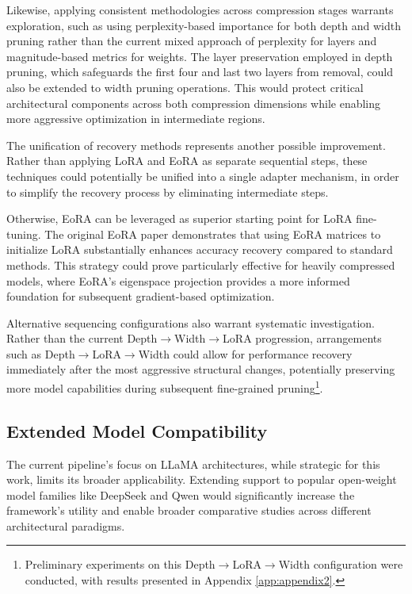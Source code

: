 Likewise, applying consistent methodologies across compression stages warrants exploration, such as using perplexity-based importance for both depth and width pruning rather than the current mixed approach of perplexity for layers and magnitude-based metrics for weights. The layer preservation employed in depth pruning, which safeguards the first four and last two layers from removal, could also be extended to width pruning operations. This would protect critical architectural components across both compression dimensions while enabling more aggressive optimization in intermediate regions.

The unification of recovery methods represents another possible improvement. Rather than applying LoRA and EoRA as separate sequential steps, these techniques could potentially be unified into a single adapter mechanism, in order to simplify the recovery process by eliminating intermediate steps.

Otherwise, EoRA can be leveraged as superior starting point for LoRA fine-tuning. The original EoRA paper \cite{eora} demonstrates that using EoRA matrices to initialize LoRA substantially enhances accuracy recovery compared to standard methods. This strategy could prove particularly effective for heavily compressed models, where EoRA's eigenspace projection provides a more informed foundation for subsequent gradient-based optimization.

Alternative sequencing configurations also warrant systematic investigation. Rather than the current Depth$\rightarrow$Width$\rightarrow$LoRA progression, arrangements such as Depth$\rightarrow$LoRA$\rightarrow$Width could allow for performance recovery immediately after the most aggressive structural changes, potentially preserving more model capabilities during subsequent fine-grained pruning\footnote{Preliminary experiments on this Depth$\rightarrow$LoRA$\rightarrow$Width configuration were conducted, with results presented in Appendix \ref{app:appendix2}.}.

\subsection{Extended Model Compatibility}
The current pipeline's focus on LLaMA architectures, while strategic for this work, limits its broader applicability. Extending support to popular open-weight model families like DeepSeek \cite{deepseek} and Qwen \cite{qwen} would significantly increase the framework's utility and enable broader comparative studies across different architectural paradigms.

